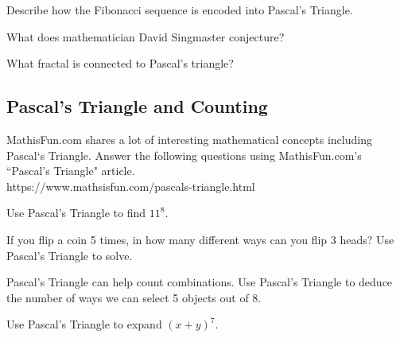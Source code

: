 \vspace{2in}

\begin{exercise}
Describe how the Fibonacci sequence is encoded into Pascal’s Triangle.
\end{exercise}

\blanks

\begin{exercise}
What does mathematician David Singmaster conjecture?
\end{exercise}

\blanks

\begin{exercise}
What fractal is connected to Pascal's triangle?
\end{exercise}

\blanks

\newpage

\subsection{Pascal's Triangle and Counting}

MathisFun.com shares a lot of interesting mathematical concepts including Pascal`s Triangle. Answer the following questions using MathisFun.com's ``Pascal's Triangle" article. \cite{mathisfun} \\
\footnotesize{https://www.mathsisfun.com/pascals-triangle.html}

\begin{exercise}
Use Pascal’s Triangle to find $11^8$.
\end{exercise}

\vspace{1in}

\begin{exercise}
If you flip a coin 5 times, in how many different ways can you flip 3 heads? Use Pascal’s Triangle to solve.
\end{exercise}

\vspace{1in}

\begin{exercise}
Pascal’s Triangle can help count combinations. Use Pascal’s Triangle to deduce the number of ways we can select 5 objects out of 8.
\end{exercise}

\vspace{1in}

\begin{exercise}
Use Pascal’s Triangle to expand $(x+y)^7$.
\end{exercise}

\vspace{2in}
